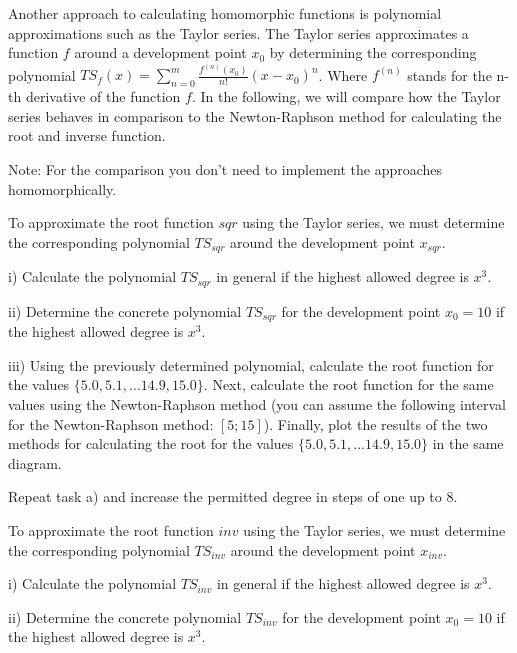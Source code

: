 \begin{aufgabe}

Another approach to calculating homomorphic functions is polynomial approximations such as the Taylor series. The Taylor series approximates a function $f$ around a development point $x_0$ by determining the corresponding polynomial $TS_f(x) = \sum_{n = 0}^m \frac{f^{(n)}(x_0)}{n!}(x-x_0)^n$. Where $f^{(n)}$ stands for the n-th derivative of the function $f$.
In the following, we will compare how the Taylor series behaves in comparison to the Newton-Raphson method for calculating the root and inverse function.

Note: For the comparison you don't need to implement the approaches homomorphically.

\begin{teilaufgabe}
    \item To approximate the root function $sqr$ using the Taylor series, we must determine the corresponding polynomial $TS_{sqr}$ around the development point $x_{sqr}$.
    \begin{teilaufgabe}
        \item[i)] Calculate the polynomial $TS_{sqr}$ in general if the highest allowed degree is  $x^3$.
        \item [ii)] Determine the concrete polynomial $TS_{sqr}$ for the development point $x_0 = 10$ if the highest allowed degree is $x^3$.
        \item[iii)] Using the previously determined polynomial, calculate the root function for the values $\{ 5.0, 5.1, ...14.9, 15.0 \}$. Next, calculate the root function for the same values using the Newton-Raphson method (you can assume the following interval for the Newton-Raphson method: $ [ 5; 15 ] $). Finally, plot the results of the two methods for calculating the root for the values $\{ 5.0, 5.1, ... 14.9, 15.0 \}$ in the same diagram.
    \end{teilaufgabe}
    \item Repeat task a) and increase the permitted degree in steps of one up to 8.
    \item To approximate the root function $inv$ using the Taylor series, we must determine the corresponding polynomial $TS_{inv}$ around the development point $x_{inv}$. 
    \begin{teilaufgabe}
        \item[i)] Calculate the polynomial $TS_{inv}$ in general if the highest allowed degree is  $x^3$.
        \item [ii)] Determine the concrete polynomial $TS_{inv}$ for the development point $x_0 = 10$ if the highest allowed degree is $x^3$.

\end{teilaufgabe}
\end{teilaufgabe}
\end{aufgabe}
